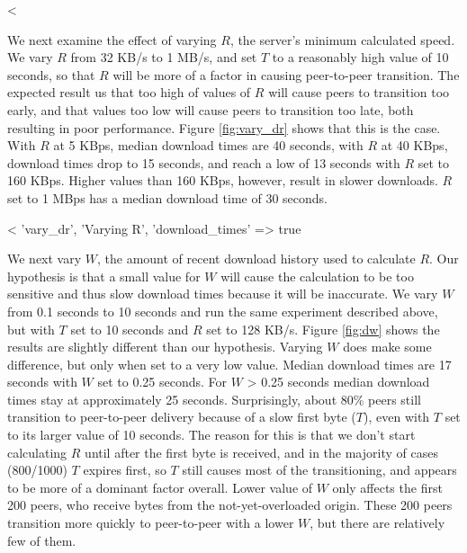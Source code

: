 <%

We next examine the effect of varying $R$, the server's minimum calculated speed.  We vary $R$ from 32 KB/s to 1 MB/s, and set $T$ to a 
reasonably high value of 10 seconds, so that $R$ will be more of a factor in causing peer-to-peer transition. 
The expected result us that too high of values of $R$ will cause peers to transition 
too early, and that values too low will cause peers to transition too late, both resulting in poor performance. Figure \ref{fig:vary_dr} shows that this is the case.
With $R$ at 5 KBps, median download times are 40 seconds, with $R$ at 40 KBps, download times drop to 15 seconds, and reach
a low of 13 seconds with $R$ set to 160 KBps. Higher values than 160 KBps, however, result in slower downloads.  $R$ set to 1 MBps has a median download time of 30 seconds. 

<%
  'vary_dr', 'Varying R', 'download_times' => true %

We next vary $W$, the amount of recent download history used to calculate $R$. Our hypothesis is that 
a small value for $W$ will cause the calculation to be too sensitive and thus slow download times because it will be inaccurate. 
We vary $W$ from 0.1 seconds 
to 10 seconds and run the same experiment described above, but with $T$ set to 10 seconds and $R$ set to 128 KB/s. Figure \ref{fig:dw} shows the results are 
slightly different than our hypothesis. Varying $W$ does make some difference, but only when set 
to a very low value. Median download times are 17 seconds with $W$ set to 0.25 seconds. For $W$ \textgreater{} 0.25 seconds
median download times stay at approximately 25 seconds. Surprisingly, 
about 80\% peers still transition to peer-to-peer delivery because of 
a slow first byte ($T$), even with $T$ set to its larger value of 10 seconds. 
The reason for this is that we don't start calculating $R$ until after the first byte is received, and 
in the majority of cases (800/1000) $T$ expires first, so $T$ still 
causes most of the transitioning, and appears to be more of a dominant factor overall.  Lower value of $W$ only affects the first 
200 peers, who receive bytes from the not-yet-overloaded origin.  
These 200 peers transition more quickly to peer-to-peer with a lower $W$, but there are relatively few of them.

